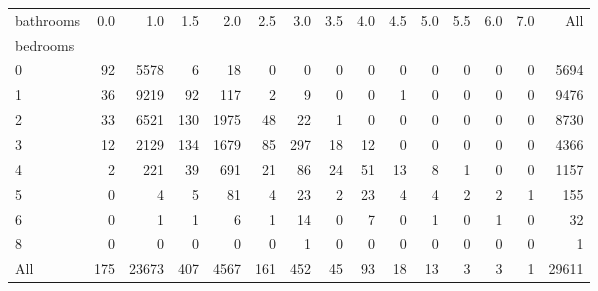 \documentclass[preview]{standalone}
\begin{document}
\begin{tabular}{lrrrrrrrrrrrrrr}
\toprule
bathrooms &  0.0 &    1.0 &  1.5 &   2.0 &  2.5 &  3.0 &  3.5 &  4.0 &  4.5 &  5.0 &  5.5 &  6.0 &  7.0 &    All \\
bedrooms &      &        &      &       &      &      &      &      &      &      &      &      &      &        \\
\midrule
0        &   92 &   5578 &    6 &    18 &    0 &    0 &    0 &    0 &    0 &    0 &    0 &    0 &    0 &   5694 \\
1        &   36 &   9219 &   92 &   117 &    2 &    9 &    0 &    0 &    1 &    0 &    0 &    0 &    0 &   9476 \\
2        &   33 &   6521 &  130 &  1975 &   48 &   22 &    1 &    0 &    0 &    0 &    0 &    0 &    0 &   8730 \\
3        &   12 &   2129 &  134 &  1679 &   85 &  297 &   18 &   12 &    0 &    0 &    0 &    0 &    0 &   4366 \\
4        &    2 &    221 &   39 &   691 &   21 &   86 &   24 &   51 &   13 &    8 &    1 &    0 &    0 &   1157 \\
5        &    0 &      4 &    5 &    81 &    4 &   23 &    2 &   23 &    4 &    4 &    2 &    2 &    1 &    155 \\
6        &    0 &      1 &    1 &     6 &    1 &   14 &    0 &    7 &    0 &    1 &    0 &    1 &    0 &     32 \\
8        &    0 &      0 &    0 &     0 &    0 &    1 &    0 &    0 &    0 &    0 &    0 &    0 &    0 &      1 \\
All      &  175 &  23673 &  407 &  4567 &  161 &  452 &   45 &   93 &   18 &   13 &    3 &    3 &    1 &  29611 \\
\bottomrule
\end{tabular}
\end{document}
